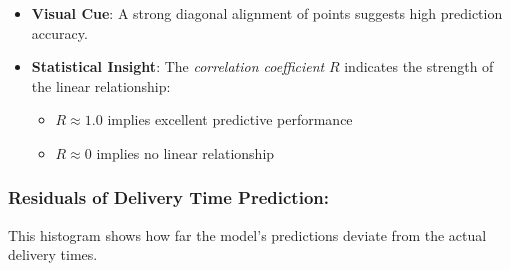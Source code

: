 \documentclass[10pt, twocolumn]{article}
\begin{document}
\begin{itemize}        
    \item \textbf{Visual Cue}: A strong diagonal alignment of points suggests high prediction accuracy.
    
    \item \textbf{Statistical Insight}: The \textit{correlation coefficient} $R$ indicates the strength of the linear relationship:
    \begin{itemize}
        \item $R \approx 1.0$ implies excellent predictive performance
        \item $R \approx 0$ implies no linear relationship
    \end{itemize}
\end{itemize}

\subsubsection{Residuals of Delivery Time Prediction:} 
 This histogram shows how far the model's predictions deviate from the actual delivery times.
 
\end{document}
